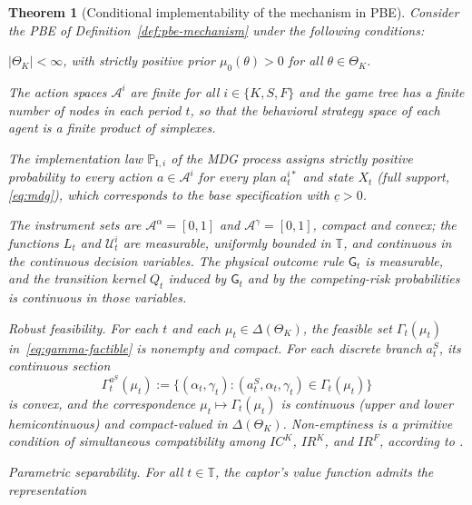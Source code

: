 \documentclass[pdflatex,sn-mathphys-ay]{sn-jnl}
\providecommand{\textcite}{\citet}
\theoremstyle{plain}
\newtheorem{theorem}{Theorem}
\theoremstyle{definition}
\newcommand{\ThetaK}{\Theta_K}
\newcommand{\1}{\mathbf{1}}
\newcommand{\ProbI}[1]{\mathbb{P}_{\mathrm{I},#1}}
\begin{document}
\begin{theorem}[Conditional implementability of the mechanism in PBE]\label{thm:ebp-implementabilidad}
\normalfont
Consider the PBE of Definition~\ref{def:pbe-mechanism} under the following conditions:
\begin{list}{}{\setlength{\labelwidth}{2.6em}\setlength{\labelsep}{0.7em}\setlength{\leftmargin}{3.3em}\setlength{\itemindent}{0pt}\setlength{\listparindent}{0pt}\setlength{\parsep}{0pt}\setlength{\itemsep}{0.35\baselineskip}}
  \item[\textup{(i)}] $|\ThetaK|<\infty$, with strictly positive prior $\mu_0(\theta)>0$ for all $\theta\in\ThetaK$.
  \item[\textup{(ii)}] The action spaces $\mathcal{A}^i$ are finite for all $i\in\{K,S,F\}$ and the game tree has a finite number of nodes in each period $t$, so that the behavioral strategy space of each agent is a finite product of simplexes.
  \item[\textup{(iii)}] The implementation law $\ProbI{i}$ of the MDG process assigns strictly positive probability to every action $a\in\mathcal{A}^i$ for every plan $a_t^{i\ast}$ and state $X_t$ \textup{(}full support, \eqref{eq:mdg}\textup{)}, which corresponds to the base specification with $\underline{c}>0$.
  \item[\textup{(iv)}] The instrument sets are $\mathcal{A}^{\alpha}=[0,1]$ and $\mathcal{A}^{\gamma}=[0,1]$, compact and convex; the functions $L_t$ and $\mathcal{U}_t^i$ are measurable, uniformly bounded in $\mathbb{T}$, and continuous in the continuous decision variables. The physical outcome rule $\mathsf{G}_t$ is measurable, and the transition kernel $Q_t$ induced by $\mathsf{G}_t$ and by the competing-risk probabilities is continuous in those variables.
  \item[\textup{(v)}] Robust feasibility. For each $t$ and each $\mu_t\in\Delta(\ThetaK)$, the feasible set $\Gamma_t(\mu_t)$ in~\eqref{eq:gamma-factible} is nonempty and compact. For each discrete branch $a_t^S$, its continuous section
  \[
  \Gamma_t^{a^S}(\mu_t):=\{(\alpha_t,\gamma_t):(a_t^S,\alpha_t,\gamma_t)\in\Gamma_t(\mu_t)\}
  \]
  is convex, and the correspondence $\mu_t\mapsto\Gamma_t(\mu_t)$ is continuous \textup{(}upper and lower hemicontinuous\textup{)} and compact-valued in $\Delta(\ThetaK)$. Non-emptiness is a primitive condition of simultaneous compatibility among $IC^K$, $IR^K$, and $IR^F$, according to \textcite{KadanRenySwinkels2017}.
  \item[\textup{(vi)}] Parametric separability. For all $t\in\mathbb{T}$, the captor's value function admits the representation

\end{list}
\end{theorem}
\end{document}
